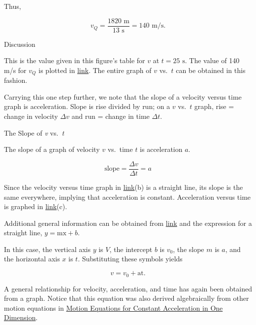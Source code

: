 \documentclass[
]{book}
\newenvironment{tinysection}{}{}
\newenvironment{note}{}{}
\begin{document}
Thus,

\leavevmode\hypertarget{import-auto-id1657105}{}%
\[{v_{Q} = \frac{\text{1820\ m}}{\text{13\ s}}} = \text{140\ m/s.}\]

\begin{tinysection}

{Discussion}

\end{tinysection}

This is the value given in this figure's table for \(v{}\) at
\(t = \text{25\ s}\). The value of 140 m/s for \(v_{Q}\) is plotted in
\protect\hyperlink{import-auto-id4141386}{link}. The entire graph
of \(v{}\) vs.~\(t\) can be obtained in this fashion.

Carrying this one step further, we note that the slope of a velocity
versus time graph is acceleration. Slope is rise divided by run; on a
\(v{}\) vs.~\(t\) graph, rise = change in velocity \({\Delta v}{}\) and run =
change in time \({\Delta t}{}\).

\hypertarget{fs-id1405001}{}
\begin{note}

The Slope of \emph{v} vs.~\emph{t}

The slope of a graph of velocity \(v{}\) vs.~time \(t{}\) is acceleration
\(a{}\).

\leavevmode\hypertarget{import-auto-id4096826}{}%
\[\text{slope} = \frac{\Delta v}{\Delta t} = a\]

\end{note}

Since the velocity versus time graph in
\protect\hyperlink{import-auto-id3596921}{link}(b) is a straight
line, its slope is the same everywhere, implying that acceleration is
constant. Acceleration versus time is graphed in
\protect\hyperlink{import-auto-id3596921}{link}(c).

Additional general information can be obtained from
\protect\hyperlink{import-auto-id4141386}{link} and the
expression for a straight line, \({y = {\text{mx} + b}}{}\).

In this case, the vertical axis \(y{}\) is \(V{}\), the intercept \(b{}\) is
\(v_{0}{}\), the slope \(m{}\) is \(a{}\), and the horizontal axis \(x{}\) is
\(t{}\). Substituting these symbols yields

\leavevmode\hypertarget{import-auto-id1714581}{}%
\[{v = {v_{0} + \text{at}}.}{}\]

A general relationship for velocity, acceleration, and time has again
been obtained from a graph. Notice that this equation was also derived
algebraically from other motion equations in \href{/m54773}{Motion Equations for
Constant Acceleration in One Dimension}.
\end{document}
